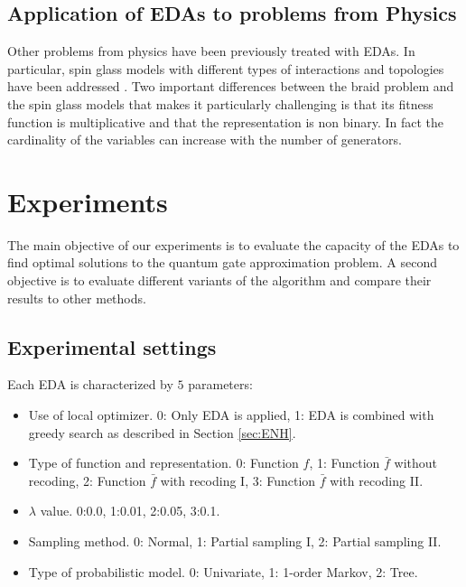   


  \subsection{Application of EDAs to problems from Physics} 
 
  Other problems from physics have been previously treated with EDAs. In particular, spin glass models with different types of interactions and topologies have been addressed \cite{Pelikan_and_Goldberg:2003r,Pelikan_and_Katzgraber:2009,Shakya_et_al:2011,Shakya_and_Santana:2012}. Two important differences between the braid problem and the spin glass models that makes it particularly challenging is that its fitness function is multiplicative and that the representation is non binary. In fact the  cardinality of the variables can increase with the number of generators.  



\section{Experiments} \label{sec:EXPE}

  The main objective of our experiments is to evaluate the capacity of the EDAs to find optimal solutions to the quantum gate approximation problem. A second objective is to evaluate different variants of the algorithm and compare their results to other methods. 


\subsection{Experimental settings}

Each EDA is characterized by $5$ parameters:

\begin{itemize}
\item   Use of local optimizer. 0: Only EDA is applied, 1: EDA is combined with greedy search as described in Section \ref{sec:ENH}. 
\item  Type of function and representation. 0: Function $f$,  1: Function $\bar{f}$ without recoding, 2: Function $\bar{f}$ with recoding I, 3: Function $\bar{f}$ with recoding II.
 \item  $\lambda$ value.  0:0.0, 1:0.01, 2:0.05, 3:0.1. 
 \item  Sampling method. 0: Normal, 1: Partial sampling I,  2: Partial sampling II. 
 \item  Type of probabilistic model. 0: Univariate, 1: 1-order Markov, 2: Tree.
\end{itemize}



